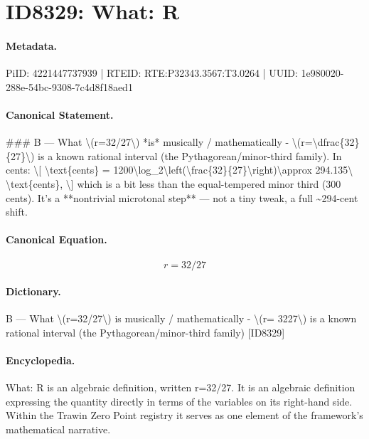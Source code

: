 \section*{ID8329: What: R}
\paragraph{Metadata.}
PiID: 4221447737939 | RTEID: RTE:P32343.3567:T3.0264 | UUID: 1e980020-288e-54bc-9308-7c4d8f18aed1

\paragraph{Canonical Statement.}
\#\#\# B — What \textbackslash{}(r=32/27\textbackslash{}) *is* musically / mathematically - \textbackslash{}(r=\textbackslash{}dfrac\{32\}\{27\}\textbackslash{}) is a known rational interval (the Pythagorean/minor-third family). In cents: \textbackslash{}[ \textbackslash{}text\{cents\} = 1200\textbackslash{}log\_2\textbackslash{}left(\textbackslash{}frac\{32\}\{27\}\textbackslash{}right)\textbackslash{}approx 294.135\textbackslash{} \textbackslash{}text\{cents\}, \textbackslash{}] which is a bit less than the equal-tempered minor third (300 cents). It’s a **nontrivial microtonal step** — not a tiny tweak, a full \textasciitilde{}294-cent shift.

\paragraph{Canonical Equation.}
\[
r=32/27
\]

\paragraph{Dictionary.}
B — What \textbackslash{}(r=32/27\textbackslash{}) is musically / mathematically - \textbackslash{}(r= 3227\textbackslash{}) is a known rational interval (the Pythagorean/minor-third family) [ID8329]

\paragraph{Encyclopedia.}
What: R is an algebraic definition, written r=32/27. It is an algebraic definition expressing the quantity directly in terms of the variables on its right-hand side. Within the Trawin Zero Point registry it serves as one element of the framework's mathematical narrative.
